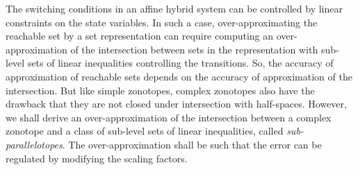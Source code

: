 The switching conditions in an affine hybrid system can be controlled
by linear constraints on the state variables.  In such a case,
over-approximating the reachable set by a set representation can
require computing an over-approximation of the intersection between
sets in the representation with sub-level sets of linear inequalities
controlling the transitions.  So, the accuracy of approximation of
reachable sets depends on the accuracy of approximation of the
intersection.  But like simple zonotopes, complex zonotopes also have
the drawback that they are not closed under intersection with
half-spaces.  However, we shall derive an over-approximation of the
intersection between a complex zonotope and a class of sub-level sets
of linear inequalities, called \emph{sub-parallelotopes}.  The
over-approximation shall be such that the error can be regulated by
modifying the scaling factors.

